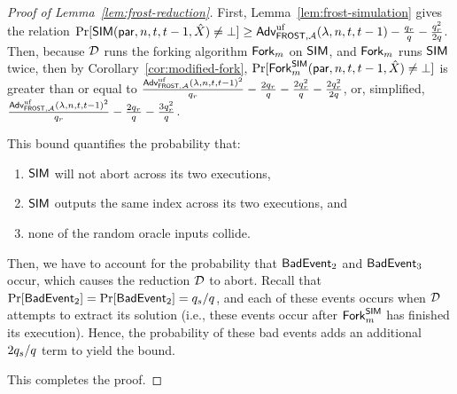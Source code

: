 \begin{proof}[Proof of Lemma~\ref{lem:frost-reduction}]
    \begin{sloppypar}
    First,
    Lemma~\ref{lem:frost-simulation} gives the relation
    $\Pr[ \mathsf{SIM}(\mathsf{par}, n, t, t-1, \hat{X}) \neq \bot ]
    \geq
    \textsf{\upshape Adv}^{\textrm{\upshape uf}}_{\mathsf{FROST},\mathcal{A}}(\lambda, n, t, t-1) -
        \frac{q_r}{q}
        - \frac{q_r^2}{2q} $.
%
    Then, because $\mathcal{D}$ runs the forking algorithm $\mathsf{Fork}_m$ on $\mathsf{SIM}$,
    and $\mathsf{Fork}_m$ runs $\mathsf{SIM}$ twice,
    then by Corollary~\ref{cor:modified-fork},
    $\Pr[ \mathsf{Fork}_m^{\mathsf{SIM}}(\mathsf{par}, n, t, t-1, \hat{X}) \neq \bot ]$
    is greater than or equal to
    $
    \frac{\textsf{\upshape Adv}^{\textrm{\upshape uf}}_{\mathsf{FROST},\mathcal{A}}(\lambda, n, t, t-1)^2}{q_r}
    - \frac{2q_r}{q}
    - \frac{2q_r^2}{q}
    - \frac{2q_r^2}{2q}
    $,
    or, simplified,
    $
    \frac{\textsf{\upshape Adv}^{\textrm{\upshape uf}}_{\mathsf{FROST},\mathcal{A}}(\lambda, n, t, t-1)^2}{q_r}
    -  \frac{2q_r}{q}
    -  \frac{3q_r^2}{q}
    $.
    \end{sloppypar}
%
    This bound quantifies the probability that:
    \begin{enumerate}
      \item $\mathsf{SIM}$ will not abort across its two executions,
      \item $\mathsf{SIM}$ outputs the same index across its two executions, and
      \item none of the random oracle inputs collide.
    \end{enumerate}

    Then, we have to account for the probability that $\mathsf{BadEvent}_2$ and $\mathsf{BadEvent}_3$ occur,
    which causes the reduction $\mathcal{D}$ to abort.
    Recall that
    $\Pr[\mathsf{BadEvent}_2] = \Pr[\mathsf{BadEvent}_2] = q_s/q$,
    and each of these events occurs when $\mathcal{D}$ attempts to extract its \AOMDL solution
    (i.e., these events occur after $\mathsf{Fork}_m^{\mathsf{SIM}}$ has finished its execution).
    Hence, the probability of these bad events adds an additional $2q_s/q$ term to yield the bound.

    This completes the proof.
\end{proof}
